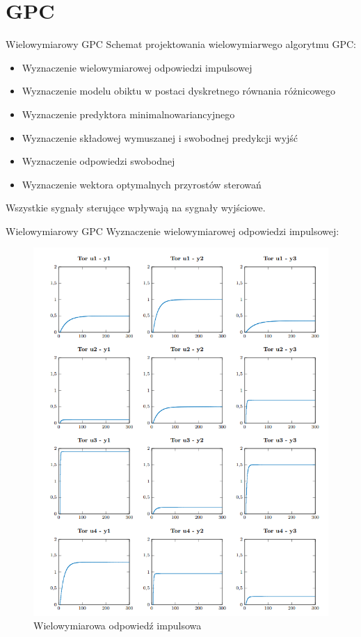 \section{GPC}
\begin{frame}{Wielowymiarowy GPC}
Schemat projektowania wielowymiarwego algorytmu GPC:
\begin{itemize}
    \item Wyznaczenie wielowymiarowej odpowiedzi impulsowej
    \item Wyznaczenie modelu obiktu w postaci dyskretnego równania różnicowego
    \item Wyznaczenie predyktora minimalnowariancyjnego
    \item Wyznaczenie składowej wymuszanej i swobodnej predykcji wyjść
    \item Wyznaczenie odpowiedzi swobodnej
    \item Wyznaczenie wektora optymalnych przyrostów sterowań
\end{itemize}
Wszystkie sygnały sterujące wpływają na sygnały wyjściowe. 
\end{frame}


\begin{frame}{Wielowymiarowy GPC}
Wyznaczenie wielowymiarowej odpowiedzi impulsowej:
	\begin{center}
		\begin{figure}[H]
            		\includegraphics[scale=0.25]{images/PIDtory.png}
          			 \caption{Wielowymiarowa odpowiedź impulsowa}
		\end{figure}
	\end{center}
\end{frame}

